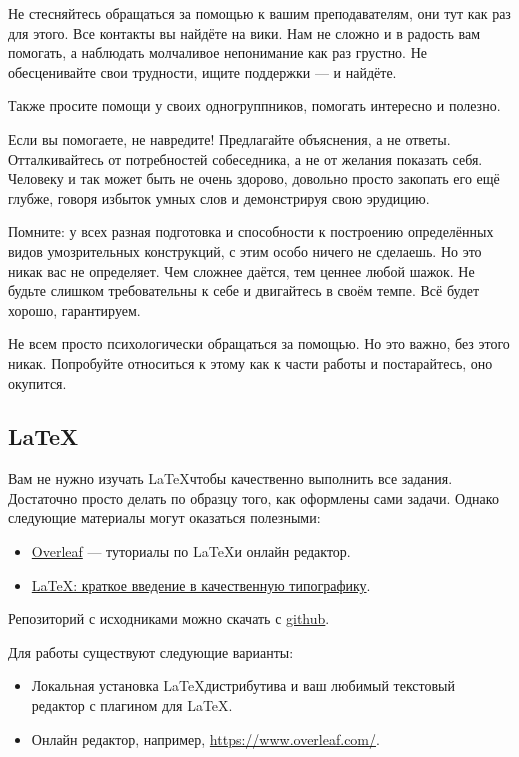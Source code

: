 \documentclass{article}
\begin{document}
    Не стесняйтесь обращаться за помощью к вашим преподавателям, они тут как раз для этого.
    Все контакты вы найдёте на вики.
    Нам не сложно и в радость вам помогать, а наблюдать молчаливое непонимание как раз грустно.
    Не обесценивайте свои трудности, ищите поддержки --- и найдёте.

    Также просите помощи у своих одногруппников, помогать интересно и полезно.

    Если вы помогаете, не навредите!
    Предлагайте объяснения, а не ответы.
    Отталкивайтесь от потребностей собеседника, а не от желания показать себя.
    Человеку и так может быть не очень здорово, довольно просто закопать его ещё глубже, говоря избыток умных слов и демонстрируя свою эрудицию.

    Помните: у всех разная подготовка и способности к построению определённых видов умозрительных конструкций, с этим особо ничего не сделаешь.
    Но это никак вас не определяет.
    Чем сложнее даётся, тем ценнее любой шажок.
    Не будьте слишком требовательны к себе и двигайтесь в своём темпе.
    Всё будет хорошо, гарантируем.

    Не всем просто психологически обращаться за помощью.
    Но это важно, без этого никак.
    Попробуйте относиться к этому как к части работы и постарайтесь, оно окупится.

    \subsection*{\LaTeX}

    Вам не нужно изучать \LaTeX чтобы качественно выполнить все задания.
    Достаточно просто делать по образцу того, как оформлены сами задачи.
    Однако следующие материалы могут оказаться полезными:

    \begin{itemize}
        \item \href{https://www.overleaf.com/learn}{Overleaf} --- туториалы по \LaTeX и онлайн редактор.
        \item \href{https://youtu.be/NOslSvJs29I}{LaTeX: краткое введение в качественную типографику}.
    \end{itemize}

    Репозиторий с исходниками можно скачать с \href{https://github.com/mse-fp2023/calculus-hws}{github}.

    Для работы существуют следующие варианты:
    \begin{itemize}
        \item Локальная установка \LaTeX дистрибутива и ваш любимый текстовый редактор с плагином для \LaTeX.
        \item Онлайн редактор, например, \url{https://www.overleaf.com/}.
    \end{itemize}
\end{document}
